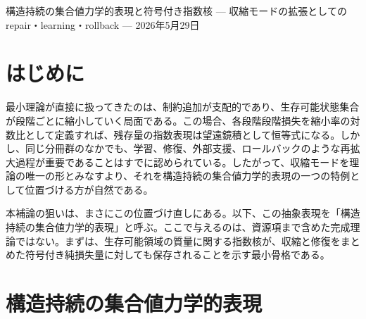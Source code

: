 \documentclass[12pt,a4paper]{article}
\begin{document}
\PaperTitleBlock
  {構造持続の集合値力学的表現と符号付き指数核}
  {— 収縮モードの拡張としての repair・learning・rollback —}
  {2026年5月29日}

\begin{abstract}
本補論の目的は、これまで主に収縮モードとして定式化してきた構造持続理論を、修復作用を含む集合値時間発展の表現へ拡張するための最小骨格を与えることである。現行の最小理論では、制約追加モデル

\[
V_{i} = V_{i-1} \cap C_{i}
\]

のもとで、生存可能状態集合の逐次縮小から指数型

\[
m(V_{n}) = m(V_0) e^{-L_{n}}
\]

が導かれる。しかし現実の系では、学習・修復・冗長化・外部支援・ロールバックのように、生存可能領域を再拡大しうる作用が重要になる。本補論では、各段階を収縮作用と修復作用の合成として与え、段階損失量と修復量を同じ対数尺度で定義することで、累積純損失量

\[
B_{n} = L_{n} - R_{n}^{\mathrm{rec}}
\]

に対する指数核

\[
m(V_{n}) = m(V_0) e^{-B_{n}}
\]

を与える。これにより、収縮モードは構造持続の集合値力学的表現の特例として回収される。
\end{abstract}

\section{はじめに}\label{ux306fux3058ux3081ux306b}

最小理論が直接に扱ってきたのは、制約追加が支配的であり、生存可能状態集合が段階ごとに縮小していく局面である。この場合、各段階段階損失を縮小率の対数比として定義すれば、残存量の指数表現は望遠鏡積として恒等式になる。しかし、同じ分冊群のなかでも、学習、修復、外部支援、ロールバックのような再拡大過程が重要であることはすでに認められている。したがって、収縮モードを理論の唯一の形とみなすより、それを構造持続の集合値力学的表現の一つの特例として位置づける方が自然である。

本補論の狙いは、まさにこの位置づけ直しにある。以下、この抽象表現を「構造持続の集合値力学的表現」と呼ぶ。ここで与えるのは、資源項まで含めた完成理論ではない。まずは、生存可能領域の質量に関する指数核が、収縮と修復をまとめた符号付き純損失量に対しても保存されることを示す最小骨格である。

\section{構造持続の集合値力学的表現}\label{ux69cbux9020ux6301ux7d9aux306eux96c6ux5408ux5024ux529bux5b66ux7684ux8868ux73fe}
\end{document}
